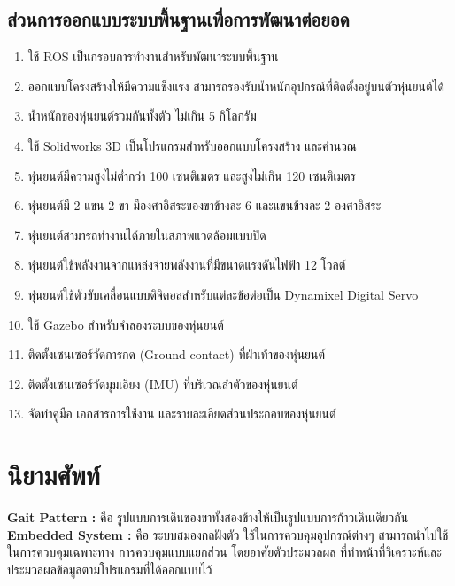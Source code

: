 \subsection{ส่วนการออกแบบระบบพื้นฐานเพื่อการพัฒนาต่อยอด}
\begin{enumerate}[label=\arabic*, leftmargin=1.5cm]
	\item ใช้ ROS เป็นกรอบการทำงานสำหรับพัฒนาระบบพื้นฐาน
	\item ออกแบบโครงสร้างให้มีความแข็งแรง สามารถรองรับน้ำหนักอุปกรณ์ที่ติดตั้งอยู่บนตัวหุ่นยนต์ได้
	\item น้ำหนักของหุ่นยนต์รวมกันทั้งตัว ไม่เกิน 5 กิโลกรัม
	\item ใช้ Solidworks 3D เป็นโปรแกรมสำหรับออกแบบโครงสร้าง และคำนวณ
	\item หุ่นยนต์มีความสูงไม่ต่ำกว่า 100 เซนติเมตร และสูงไม่เกิน 120 เซนติเมตร
	\item หุ่นยนต์มี 2 แขน 2 ขา มีองศาอิสระของขาข้างละ 6 และแขนข้างละ 2 องศาอิสระ
	\item หุ่นยนต์สามารถทำงานได้ภายในสภาพแวดล้อมแบบปิด
	\item หุ่นยนต์ใช้พลังงานจากแหล่งจ่ายพลังงานที่มีขนาดแรงดันไฟฟ้า 12 โวลต์
	\item หุ่นยนต์ใช้ตัวขับเคลื่อนแบบดิจิตอลสำหรับแต่ละข้อต่อเป็น Dynamixel Digital Servo
	\item ใช้ Gazebo สำหรับจำลองระบบของหุ่นยนต์
	\item ติดตั้งเซนเซอร์วัดการกด (Ground contact) ที่ฝ่าเท้าของหุ่นยนต์
	\item ติดตั้งเซนเซอร์วัดมุมเอียง (IMU) ที่บริเวณลำตัวของหุ่นยนต์
	\item จัดทำคู่มือ เอกสารการใช้งาน และรายละเอียดส่วนประกอบของหุ่นยนต์
\end{enumerate}

\section{นิยามศัพท์}
{
\textbf{Gait Pattern :}
คือ รูปแบบการเดินของขาทั้งสองข้างให้เป็นรูปแบบการก้าวเดินเดียวกัน \\
\textbf{Embedded System :}
คือ ระบบสมองกลฝังตัว ใช้ในการควบคุมอุปกรณ์ต่างๆ สามารถนำไปใช้ในการควบคุมเฉพาะทาง
การควบคุมแบบแยกส่วน โดยอาศัยตัวประมวลผล ที่ทำหน้าที่วิเคราะห์และประมวลผลข้อมูลตามโปรแกรมที่ได้ออกแบบไว้
}

